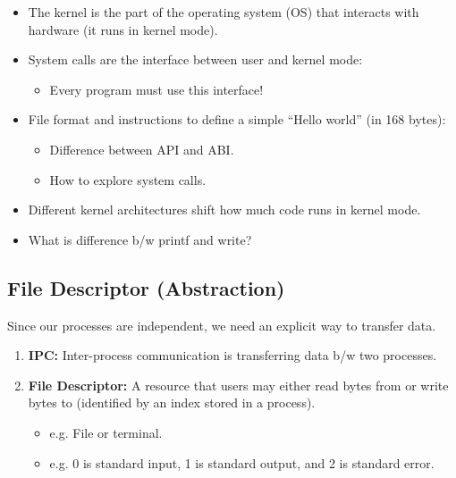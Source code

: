 \begin{summary}
    \begin{itemize}
        \item The kernel is the part of the operating system (OS) that interacts with hardware (it runs in kernel mode).
        \item System calls are the interface between user and kernel mode:
        \begin{itemize}
            \item Every program must use this interface!
        \end{itemize}
        \item File format and instructions to define a simple “Hello world” (in 168 bytes):
        \begin{itemize}
            \item Difference between API and ABI.
            \item How to explore system calls.
        \end{itemize}
        \item Different kernel architectures shift how much code runs in kernel mode.
    \end{itemize}    
\end{summary}

\begin{faq}
    \begin{itemize}
        \item What is difference b/w printf and write?
    \end{itemize}
\end{faq}
\subsection{File Descriptor (Abstraction)}
\begin{motivation}
    Since our processes are independent, we need an explicit way to transfer data.
\end{motivation}

\begin{definition}
    \begin{enumerate}
        \item \textbf{IPC:} Inter-process communication is transferring data b/w two processes.
        \item \textbf{File Descriptor:} A resource that users may either read bytes from or write bytes to (identified by an index stored in a process).
        \begin{itemize}
            \item e.g. File or terminal.
            \item e.g. 0 is standard input, 1 is standard output, and 2 is standard error.
        \end{itemize}
    \end{enumerate}
\end{definition}

